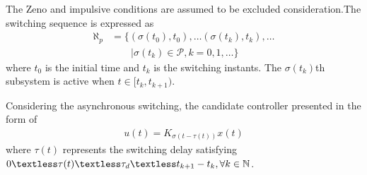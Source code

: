 \documentclass[twocolumn]{autart}    %
\begin{document}
The Zeno and impulsive conditions are assumed to be excluded consideration.The switching sequence is expressed as 
\begin{equation} \label{e1}
    \begin{aligned}
        \aleph _{p} &= \{(\sigma(t_{0}),t_{0}),\ldots (\sigma(t_{k}),t_{k}),\ldots\\
        & \qquad |\sigma(t_{k}) \in \mathcal{P},k = 0,1,\ldots\}
    \end{aligned}
\end{equation}
where $t_{0}$ is the initial time and  $t_{k}$ is the switching instants. The $\sigma(t_{k})$th subsystem is active when $t \in [t_{k},t_{k+1})$. 

Considering the asynchronous switching, the candidate controller presented in the form of 
\begin{equation} \label{e1}
    \begin{aligned}
        u(t) = K_{\sigma(t-\tau(t))}x(t)
    \end{aligned}
\end{equation}
where $\tau(t)$ represents the switching delay satisfying $0 \textless \tau(t) \textless \tau_{d} \textless t_{k+1}-t_{k},\forall k \in \mathbb{N} $.
\end{document}
